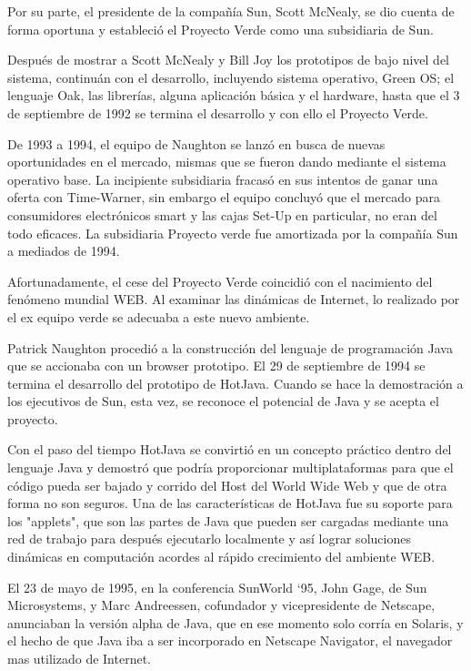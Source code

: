 \documentclass[11pt,a4paper]{article}
\begin{document}
\begin{multicols}{2}
Por su parte, el presidente de la compañía Sun, Scott McNealy, se dio cuenta de forma oportuna y estableció el Proyecto Verde como una subsidiaria de Sun.

Después de mostrar a Scott McNealy y Bill Joy los prototipos de bajo nivel del sistema, continuán con el desarrollo, incluyendo sistema operativo, Green OS; el lenguaje Oak, las librerías, alguna aplicación básica y el hardware, hasta que el 3 de septiembre de 1992 se termina el desarrollo y con ello el Proyecto Verde.

De 1993 a 1994, el equipo de Naughton se lanzó en busca de nuevas oportunidades en el mercado, mismas que se fueron dando mediante el sistema operativo base.
La incipiente subsidiaria fracasó en sus intentos de ganar una oferta con Time-Warner, sin embargo el equipo concluyó que el mercado para consumidores electrónicos smart y las cajas Set-Up en particular, no eran del todo eficaces. La subsidiaria Proyecto verde fue amortizada por la compañía Sun a mediados de 1994.

Afortunadamente, el cese del Proyecto Verde coincidió con el nacimiento del fenómeno mundial WEB. Al examinar las dinámicas de Internet, lo realizado por el ex equipo verde se adecuaba a este nuevo ambiente.

Patrick Naughton procedió a la construcción del lenguaje de programación Java que se accionaba con un browser prototipo. El 29 de septiembre de 1994 se termina el desarrollo del prototipo de HotJava. Cuando se hace la demostración a los ejecutivos de Sun, esta vez, se reconoce el potencial de Java y se acepta el proyecto.

Con el paso del tiempo HotJava se convirtió en un concepto práctico dentro del lenguaje Java y demostró que podría proporcionar multiplataformas para que el código pueda ser bajado y corrido del Host del World Wide Web y que de otra forma no son seguros. 
Una de las características de HotJava fue su soporte para los "applets", que son las partes de Java que pueden ser cargadas mediante una red de trabajo para después ejecutarlo localmente y así lograr soluciones dinámicas en computación acordes al rápido crecimiento del ambiente WEB.

El 23 de mayo de 1995, en la conferencia SunWorld `95, John Gage, de Sun Microsystems, y Marc Andreessen, cofundador y vicepresidente de Netscape, anunciaban la versión alpha de Java, que en ese momento solo corría en Solaris, y el hecho de que Java iba a ser incorporado en Netscape Navigator, el navegador mas utilizado de Internet.


\end{multicols}
\end{document}
